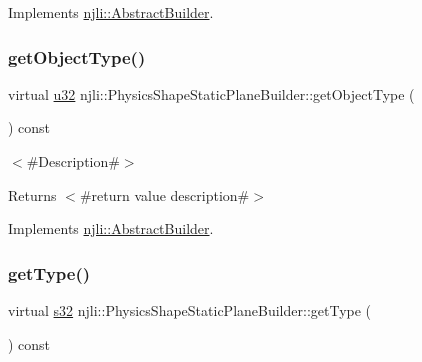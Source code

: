Implements \mbox{\hyperlink{classnjli_1_1_abstract_builder_a902f73ea78031b06aca183a417f3413b}{njli\+::\+Abstract\+Builder}}.

\mbox{\label{classnjli_1_1_physics_shape_static_plane_builder_ad138ee89da6ee49660b08491bef40b49}} 
\subsubsection{\texorpdfstring{get\+Object\+Type()}{getObjectType()}}
{\footnotesize\ttfamily virtual \mbox{\hyperlink{_util_8h_a10e94b422ef0c20dcdec20d31a1f5049}{u32}} njli\+::\+Physics\+Shape\+Static\+Plane\+Builder\+::get\+Object\+Type (\begin{DoxyParamCaption}{ }\end{DoxyParamCaption}) const\hspace{0.3cm}{\ttfamily [virtual]}}

$<$\#\+Description\#$>$

\begin{DoxyReturn}{Returns}
$<$\#return value description\#$>$ 
\end{DoxyReturn}


Implements \mbox{\hyperlink{classnjli_1_1_abstract_builder_a0f2d344fcf697b167f4f2b1122b5fb33}{njli\+::\+Abstract\+Builder}}.

\mbox{\label{classnjli_1_1_physics_shape_static_plane_builder_a051e1a65d40481c515d2140485dd0de2}} 
\subsubsection{\texorpdfstring{get\+Type()}{getType()}}
{\footnotesize\ttfamily virtual \mbox{\hyperlink{_util_8h_aa62c75d314a0d1f37f79c4b73b2292e2}{s32}} njli\+::\+Physics\+Shape\+Static\+Plane\+Builder\+::get\+Type (\begin{DoxyParamCaption}{ }\end{DoxyParamCaption}) const\hspace{0.3cm}{\ttfamily [virtual]}}

